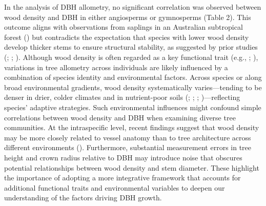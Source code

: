 \documentclass[
  12pt,
  letterpaper,
  DIV=11,
  numbers=noendperiod]{scrartcl}
\begin{document}
In the analysis of DBH allometry, no significant correlation was
observed between wood density and DBH in either angiosperms or
gymnosperms (Table 2). This outcome aligns with observations from
saplings in an Australian subtropical forest
() but contradicts
the expectation that species with lower wood density develop thicker
stems to ensure structural stability, as suggested by prior studies
(;
;
). Although wood density is
often regarded as a key functional trait (e.g.,
;
), variations in tree
allometry across individuals are likely influenced by a combination of
species identity and environmental factors. Across species or along
broad environmental gradients, wood density systematically
varies---tending to be denser in drier, colder climates and in
nutrient-poor soils (; ;
;
)---reflecting species' adaptive
strategies. Such environmental influences might confound simple
correlations between wood density and DBH when examining diverse tree
communities. At the intraspecific level, recent findings suggest that
wood density may be more closely related to vessel anatomy than to tree
architecture across different environments
(). Furthermore,
substantial measurement errors in tree height and crown radius relative
to DBH may introduce noise that obscures potential relationships between
wood density and stem diameter. These highlight the importance of
adopting a more integrative framework that accounts for additional
functional traits and environmental variables to deepen our
understanding of the factors driving DBH growth.
\end{document}
